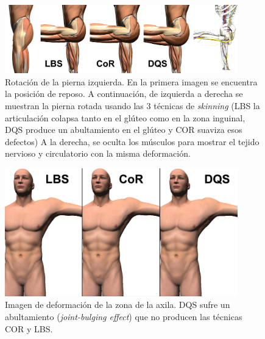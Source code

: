 \begin{figure}[h]%
  \centering
  \includegraphics[width=0.90\textwidth]{IMG/compculo}
    \caption{ Rotación de la pierna izquierda. En la primera imagen se encuentra la posición de reposo. A continuación, de izquierda a derecha se muestran la pierna rotada usando las 3 técnicas de \emph{skinning} (\ac{LBS} la articulación colapsa tanto en el glúteo como en la zona inguinal, \ac{DQS} produce un abultamiento en el glúteo y \ac{COR} suaviza esos defectos) A la derecha, se oculta los músculos para mostrar el tejido nervioso y circulatorio con la misma deformación.}
    \label{fig:thigh_bending}
\end{figure}

\begin{figure}[h]%
  \centering
  \includegraphics[width=0.90\textwidth]{IMG/sobaco.png}
    \caption{Imagen de deformación de la zona de la axila. \ac{DQS} sufre un abultamiento (\emph{joint-bulging effect}) que no producen las técnicas \ac{COR} y \ac{LBS}. }
    \label{fig:axila}
\end{figure}






